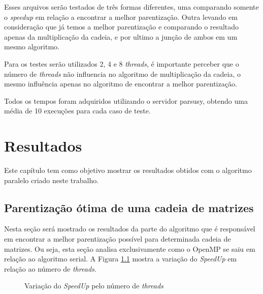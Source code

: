 \documentclass[12pt,openright,oneside,chapter=TITLE,section=TITLE,
    brazil]{utfpr-pg}
\begin{document}
Esses arquivos serão testados de três formas diferentes, uma comparando somente o \emph{speedup} em relação a encontrar a melhor parentização. Outra levando em consideração que já temos a melhor parentização e comparando o resultado apenas da multiplicação da cadeia, e por ultimo a junção de ambos em um mesmo algoritmo. 

Para os testes serão utilizados 2, 4 e 8 \emph{threads}, é importante perceber que o número de \emph{threads} não influencia no algoritmo de multiplicação da cadeia, o mesmo influência apenas no algoritmo de encontrar a melhor parentização. 

Todos os tempos foram adquiridos utilizando o servidor parsusy, obtendo uma média de 10 execuções para cada caso de teste.

\vspace{1cm}
{\let\clearpage\relax \chapter{Resultados}}
\vspace{-0.7cm}

Este capítulo tem como objetivo mostrar os resultados obtidos com o algoritmo paralelo criado neste trabalho.

\vspace{0.5cm}
\section{Parentização ótima de uma cadeia de matrizes}
\vspace{-0.7cm}

Nesta seção será mostrado os resultados da parte do algoritmo que é responsável em encontrar a melhor parentização possível para determinada cadeia de matrizes. Ou seja, esta seção analisa exclusivamente como o OpenMP se saiu em relação ao algoritmo serial. A Figura \ref{fig:order} mostra a variação do \emph{SpeedUp} em relação ao número de \emph{threads}.

\begin{figure}[h]
	\centering	
	{%
		\setlength{\fboxsep}{0pt}%
		\setlength{\fboxrule}{1pt}%
	}%
	\vspace{-0.3cm}
	\caption{Variação do \emph{SpeedUp} pelo número de \emph{threads}} \label{fig:order}
\end{figure}
\end{document}
